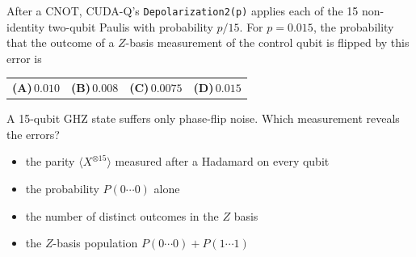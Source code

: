\documentclass[11pt,a4paper]{article}
\newcommand{\optlabel}[1]{\textbf{(#1)}}
\newenvironment{qitem}[1]{\begin{list}{}{\setlength{\leftmargin}{3.3em}\setlength{\labelwidth}{3.1em}%
  \setlength{\labelsep}{0.2em}\setlength{\topsep}{3pt}\setlength{\parsep}{3pt}}\item[\textbf{Q.#1}\hfill]}{\end{list}}
\newcommand{\qsep}{\par\vspace{2pt}{\color{black!15}\hrule}\vspace{4pt}}
\begin{document}
\begin{qitem}{33}
After a CNOT, CUDA-Q's \texttt{Depolarization2(p)} applies each of the 15 non-identity two-qubit Paulis with probability $p/15$. For $p = 0.015$, the
probability that the outcome of a $Z$-basis measurement of the control qubit is flipped by this error is
\par\smallskip\noindent\begin{tabularx}{\linewidth}{@{}*{4}{L}@{}}
\optlabel{A}\,$0.010$ & \optlabel{B}\,$0.008$ & \optlabel{C}\,$0.0075$ & \optlabel{D}\,$0.015$
\end{tabularx}
\end{qitem}
\qsep

\begin{qitem}{34}
A 15-qubit GHZ state suffers only phase-flip noise. Which measurement reveals the errors?
\begin{itemize}[leftmargin=2.6em, labelsep=0.4em, itemsep=2pt, topsep=3pt]
\item[\optlabel{A}] the parity $\langle X^{\otimes15}\rangle$ measured after a Hadamard on every qubit
\item[\optlabel{B}] the probability $P(0\cdots0)$ alone
\item[\optlabel{C}] the number of distinct outcomes in the $Z$ basis
\item[\optlabel{D}] the $Z$-basis population $P(0\cdots0) + P(1\cdots1)$
\end{itemize}
\end{qitem}
\qsep
\end{document}
